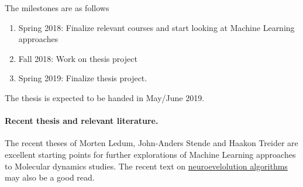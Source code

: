 \documentclass[%
oneside,                 %
final,                   %
10pt]{article}
\begin{document}
\noindent
The milestones are as follows
\begin{enumerate}
\item Spring 2018: Finalize relevant courses and start looking at Machine Learning approaches

\item Fall 2018: Work on thesis project

\item Spring 2019: Finalize thesis project.
\end{enumerate}

\noindent
The thesis is expected to be handed in May/June  2019.



\paragraph{Recent thesis and relevant literature.}
The recent theses of Morten Ledum, John-Anders Stende and Haakon Treider are excellent starting points for further explorations of Machine Learning approaches to Molecular dynamics studies. The recent text on \href{{https://www.oreilly.com/ideas/neuroevolution-a-different-kind-of-deep-learning}}{neuroevelolution algorithms}  may also be a good read.









\end{document}
